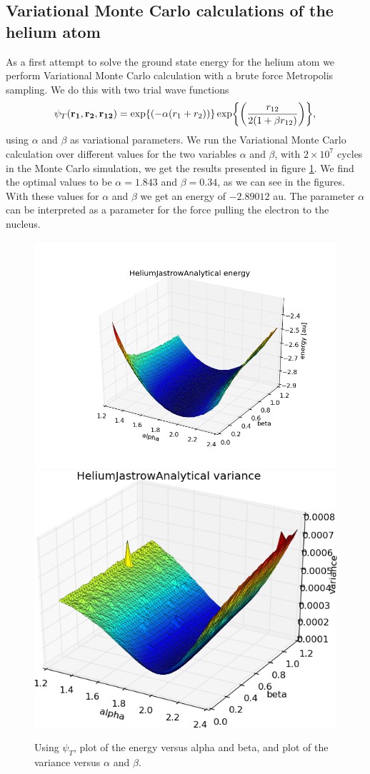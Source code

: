 
	\subsection{Variational Monte Carlo calculations of the helium atom}
		As a first attempt to solve the ground state energy for the helium
		atom we perform Variational Monte Carlo calculation with a brute force
		Metropolis sampling. We do this with two trial wave functions
		\[
		\psi_{T}({\bf r_{1}},{\bf r_{2}},{\bf r_{12}})=\exp{\left(-\alpha(r_{1}+r_{2})\right)}\exp{\left(\frac{r_{12}}{2(1+\beta r_{12})}\right)},
		\]
		using $\alpha$ and $\beta$ as variational parameters. 
		We run the Variational Monte Carlo calculation over
		different values for the two variables $\alpha$ and $\beta$, 
		with $2\times10^{7}$ cycles in the Monte Carlo simulation, we get the results
		presented in figure \ref{fig:HeliumAlphaBeta}.
		We find the optimal values to be  $\alpha=1.843$ and $\beta=0.34$, as we can see in the figures.
		With these values for $\alpha$ and $\beta$ we get an energy of $-2.89012$ au.
		The parameter $\alpha$ can be interpreted as a parameter for the
		force pulling the electron to the nucleus.


		


		\begin{figure}
			\centering \includegraphics[width=0.49\linewidth]{../figures/HeliumJastrowAnalytical_alpha_beta_energy}
			\includegraphics[width=0.49\linewidth]{../figures/HeliumJastrowAnalytical_alpha_beta_variance}
			\protect\caption{Using $\psi_{T}$, plot of the energy versus alpha and beta, and plot of the variance versus $\alpha$ and $\beta$. }
			\label{fig:HeliumAlphaBeta}
		\end{figure}


